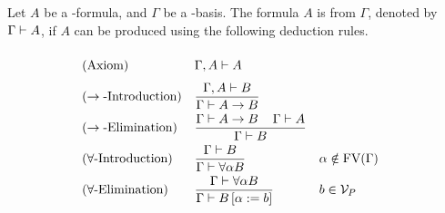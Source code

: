 \begin{definition}
Let $A$ be a \SysP-formula, and $\Gamma$ be a \SysP-basis. The formula $A$ is  from $\Gamma$, denoted by $\Gamma\vdash A$, if $A$ can be produced using the following deduction rules.
\begin{mdframed}
	\begingroup%
	\addtolength{\jot}{0.3cm}
	\begin{align*}
		&(\text{Axiom}) &&\Gamma,A\PModels A\vphantom{\frac{\Gamma}{\Gamma}}\\
		&(\rightarrow\text{-Introduction}) &&\frac{\Gamma,A\PModels B}{\Gamma\PModels A\to B}\\
		&(\rightarrow\text{-Elimination}) &&\frac{\Gamma\PModels A\to B \hspace{0.4cm}\Gamma\PModels A}{\Gamma\PModels B}\\
		  & (\forall\text{-Introduction}) &   & \frac{\Gamma\PModels B}{\Gamma\PModels \forall\alpha B} &   & \alpha\notin\FV(\Gamma) \\
		&(\forall\text{-Elimination}) &&\frac{\Gamma\PModels \forall\alpha B }{\Gamma\PModels B\left[ \alpha:=b\right] }
		&& b\in\VarP %
	\end{align*}
	\endgroup
\end{mdframed}
\end{definition}

